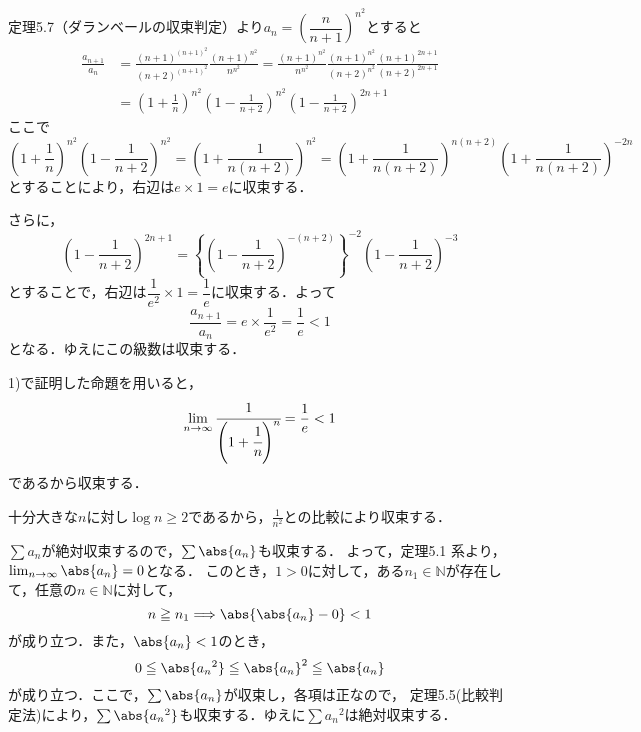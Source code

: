 \begin{tanswer}
    定理5.7（ダランベールの収束判定）より$a_n=\left(\dfrac{n}{n+1}\right)^{n^2}$とすると
    \begin{align*}
        \frac{a_{n+1}}{a_n} & =\frac{(n+1)^{(n+1)^2}}{(n+2)^{(n+1)^2}}\frac{(n+1)^{n^2}}{n^{n^2}}=\frac{(n+1)^{n^2}}{n^{n^2}}\frac{(n+1)^{n^2}}{(n+2)^{n^2}}\frac{(n+1)^{2n+1}}{(n+2)^{2n+1}} \\
                            & =\left(1+\frac{1}{n}\right)^{n^2}\left(1-\frac{1}{n+2}\right)^{n^2}\left(1-\frac{1}{n+2}\right)^{2n+1}
    \end{align*}
    ここで
    \[
        \left(1+\frac{1}{n}\right)^{n^2}\left(1-\frac{1}{n+2}\right)^{n^2}=\left(1+\frac{1}{n(n+2)}\right)^{n^2}=\left(1+\frac{1}{n(n+2)}\right)^{n(n+2)}\left(1+\frac{1}{n(n+2)}\right)^{-2n}
    \]
    とすることにより，右辺は$e \times 1=e$に収束する．

    さらに，
    \[
        \left(1-\frac{1}{n+2}\right)^{2n+1}=\left\{\left(1-\frac{1}{n+2}\right)^{-(n+2)}\right\}^{-2}\left(1-\frac{1}{n+2}\right)^{-3}
    \]
    とすることで，右辺は$\dfrac{1}{e^2} \times 1=\dfrac{1}{e}$に収束する．よって
    \[
        \frac{a_{n+1}}{a_n}=e \times \frac{1}{e^2}=\frac{1}{e}<1
    \]
    となる．ゆえにこの級数は収束する．
\end{tanswer}


\begin{tanswer}
    1)で証明した命題を用いると，
    \[
        \lim _{n \to \infty} \cfrac{1}{\Bigg(1+\cfrac{1}{n}\Bigg)^n} = \frac{1}{e} < 1
    \]
    であるから収束する．
\end{tanswer}




\begin{tanswer}
    十分大きな$n$に対し$\log n \geq 2$であるから，$\frac{1}{n^2}$との比較により収束する．
\end{tanswer}




\begin{tproof}
    $\sum a_n $が絶対収束するので，$\sum \abs{a_n}$も収束する．
    よって，定理5.1 系より，$\lim_{n \to \infty} \abs{a_n} =0$となる．
    このとき，$1>0$に対して，ある$n_1 \in \mathbb{N}$が存在して，任意の$n \in \mathbb{N}$に対して，
    \[
        n \ge n_1 \Longrightarrow \abs{\abs{a_n} -0}<1
    \]
    が成り立つ．また，$\abs{a_n}<1$のとき，
    \[
        0 \le \abs{{a_n}^2} \le {\abs{a_n}}^2 \le \abs{a_n}
    \]
    が成り立つ．ここで，$\sum \abs{a_n}$が収束し，各項は正なので， 定理5.5(比較判定法)により，$\sum \abs{{a_n}^2}$も収束する．ゆえに$\sum {a_n}^2$は絶対収束する．
\end{tproof}


